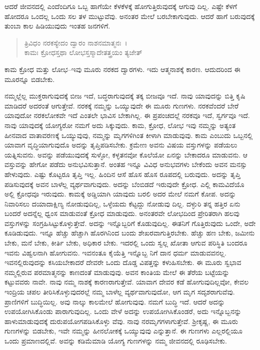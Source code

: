 ಆದರೆ ಜೀವನದಲ್ಲಿ ಎಂದೆಂದಿಗೂ ಒಬ್ಬ ಹಾಗೆಯೇ ಕೆಳಕೆಳಕ್ಕೆ ಹೋಗುತ್ತಿರುವುದಕ್ಕೆ ಆಗುವು ದಿಲ್ಲ. ಎಷ್ಟೇ ಕೆಳಗೆ ಹೋದರೂ ಒಂದಲ್ಲ ಒಂದು ಸಲ ತಳ ಮುಟ್ಟುವೆವು. ಅನಂತರ ಮೇಲೆ ಬರಬೇಕಾಗುವುದು. ಆದರೆ ಹಾಗೆ ಬರುವುದಕ್ಕೆ ತುಂಬಾ ಕಾಲ ಹಿಡಿಯುವುದು ಇಂತಹ ಜನಗಳಿಗೆ.

\begin{verse}
ತ್ರಿವಿಧಂ ನರಕಸ್ಯೇದಂ ದ್ವಾರಂ ನಾಶನಮಾತ್ಮನಃ~।\\ಕಾಮಃ ಕ್ರೋಧಸ್ತಥಾ ಲೋಭಸ್ತಸ್ಮಾದೇತತ್ತ್ರಯಂ ತ್ಯಜೇತ್ 
\end{verse}

{\small ಕಾಮ ಕ್ರೋಧ ಮತ್ತು ಲೋಭ--ಇವು ಮೂರು ನರಕದ ದ್ವಾರಗಳು. ಇದು ಆತ್ಮನಾಶಕ್ಕೆ ಕಾರಣ. ಆದುದರಿಂದ ಈ ಮೂರನ್ನೂ ಬಿಡಬೇಕು.}

ನಮ್ಮಲ್ಲೆಲ್ಲ ಮುಕ್ತರಾಗುವುದಕ್ಕೆ ಬೀಜ ಇದೆ, ಬದ್ಧರಾಗುವುದಕ್ಕೆ ತಕ್ಕ ಬೀಜವೂ ಇದೆ. ನಾವು ಯಾವುದನ್ನು ಬಿತ್ತಿ ಕೃಷಿ ಮಾಡಿದರೆ ಅದರಂತೆ ಆಗುತ್ತೇವೆ. ನರಕಕ್ಕೆ ನಮ್ಮನ್ನು ಒಯ್ಯುವುದೇ ಈ ಮೂರು ಗುಣಗಳು. ನರಕವೆಂದರೆ ಬೇರೆ ಯಾವುದೋ ನರಕಲೋಕವೇ ಇದೆ ಎಂತಲೇ ಭಾವಿಸ ಬೇಕಾಗಿಲ್ಲ. ಈ ಪ್ರಪಂಚದಲ್ಲೆ ನರಕವೂ ಇದೆ, ಸ್ವರ್ಗವೂ ಇದೆ. ನಾವು ಯಾವುದಕ್ಕೆ ಯೋಗ್ಯರೋ ನಮಗೆ ಅದು ಸಿಕ್ಕುವುದು. ಕಾಮ, ಕ್ರೋಧ, ಲೋಭ ಇವು ನಮ್ಮನ್ನು ಅತ್ಯಂತ ಹೀನವಾದ ವಾತಾವರಣಕ್ಕೆ ಒಯ್ಯುವುವು, ನಮ್ಮನ್ನು ಮೃಗಗಳಿಗಿಂತ ಕೀಳಾಗಿ ಮಾಡುವುವು. ಕಾಮ ಎಂಬುದು ಒಬ್ಬನಲ್ಲಿ ಯಾವಾಗ ವೃದ್ಧಿಯಾಗುವುದೊ ಅದನ್ನು ತೃಪ್ತಿಪಡಿಸಬೇಕು. ಕ್ರಮೇಣ ಅವನು ವಿಷಯ ವಸ್ತುಗಳನ್ನು ಪಡೆಯಲು ಯತ್ನಿಸುವನು. ಅವನ್ನು ಪಡೆಯುವುದಕ್ಕೆ ಸುಳ್ಳೋ, ಕಳ್ಳತನವೋ ಕೊಲೆಯೋ ಏನನ್ನು ಬೇಕಾದರೂ ಮಾಡುವನು. ಆ ವಸ್ತುವನ್ನು ಹೇಗೋ ಪಡೆದು ಅನುಭವಿಸುತ್ತಾನೆ. ಅಂತಹ ಇನ್ನೂ ವಿವಿಧ ಅನುಭವಗಳು ಬೇಕೆಂದು ಅವನ ಮನಸ್ಸು ಹೇಳುವುದು. ಎಷ್ಟು ಕೊಟ್ಟರೂ ತೃಪ್ತಿ ಇಲ್ಲ. ಹಿಂದಿನ ಆಸೆ ಹೊಸ ಹೊಸ ರೂಪದಲ್ಲಿ ಬರುವುದು. ಅದನ್ನು ತೃಪ್ತಿ ಪಡಿಸುವುದಕ್ಕೆ ಅವನ ಬಾಳೆಲ್ಲ ವ್ಯರ್ಥವಾಗುವುದು. ಅದನ್ನು ಬೆಂಬಿಡದೆ ಇರುವುದೇ ಕ್ರೋಧ. ಎಲ್ಲಿ ಕಾಮವಿದೆಯೊ ಅಲ್ಲಿ ಕ್ರೋಧವೂ ಇರುವುದು. ಕಾಮಕ್ಕೆ ಅಡ್ಡಿಯಾಗಿ ಯಾವುದು ಬರಲಿ ಅದರ ಮೇಲೆ ನಮಗೆ ಕೋಪ. ಅದನ್ನು ನಿವಾರಿಸಲು ದಯಾದಾಕ್ಷಿಣ್ಯ ನೋಡುವುದಿಲ್ಲ, ಒಳ್ಳೆಯದು ಕೆಟ್ಟದ್ದು ನೋಡುವು ದಿಲ್ಲ. ದಳ್ಳುರಿ ತನ್ನ ಹತ್ತಿರ ಏನು ಬಂದರೆ ಅದನ್ನೆಲ್ಲ ಧ್ವಂಸ ಮಾಡುವಂತೆ ಕ್ರೋಧ ಮಾಡುವುದು. ಅನಂತರವೇ ಲೋಭದಿಂದ ಪ್ರೇರಿತರಾಗಿ ಹಲವು ವಸ್ತುಗಳನ್ನು ಸಂಗ್ರಹಿಸಿಟ್ಟುಕೊಳ್ಳುತ್ತೇವೆ. ಅದನ್ನು ಇನ್ನೊಬ್ಬರಿಗೆ ಕೊಡುವುದಿಲ್ಲ. ಈತನಿಗೆ ಗೊತ್ತಿರುವುದು ಒಂದೇ, ಅದೇ ಕೂಡಿಡುವುದು. ಇನ್ನೂ ಹೆಚ್ಚು ಹೆಚ್ಚಾಗಿ ಹೊರಗಿನಿಂದ ಬಂದು ಶೇಖರವಾಗುತ್ತಿರಬೇಕು. ಹೆಚ್ಚು ಹಣ ಬೇಕು, ಜಮೀನು ಬೇಕು, ಮನೆ ಬೇಕು, ಕೀರ್ತಿ ಬೇಕು, ಅಧಿಕಾರ ಬೇಕು. ಇದರಲ್ಲಿ ಒಂದು ಸ್ವಲ್ಲ ಖೋತಾ ಆಗುವ ಪರಿಸ್ಥಿತಿ ಬಂದರೂ ಇವನು ವಿಹ್ವಲನಾಗಿ ಹೋಗುವನು. ಇವನಂತೂ ಕೈಯೆತ್ತಿ ಇನ್ನೊಬ್ಬ ನಿಗೆ ದಾನ ಧರ್ಮ ಮಾಡುವವನಲ್ಲ. ಇವನಲ್ಲಿರುವುದನ್ನು ಕಸಿಯಬೇಕಾದರೆ ದೇವರೇ ಒಂದು ದೊಡ್ಡ ವಿಪತ್ತನ್ನು ಕಳುಹಿಸಬೇಕು. ಈ ಮೂರು ಸ್ವಭಾವ ನಮ್ಮಲ್ಲಿರುವ ಪರಮಾತ್ಮನನ್ನು ಕಾಣದಂತೆ ಮಾಡುವುವು. ಅವನ ಕಾಂತಿಯ ಮೇಲೆ ಈ ತೆರೆಯ ಬಟ್ಟೆಯನ್ನು ಕಟ್ಟುವವರು ನಾವೇ. ನಾವು ನಮ್ಮ ನಾಶಕ್ಕೆ ಕಾರಣರಾಗುತ್ತೇವೆ. ಯಾವಾಗ ದೇವರ ಕಡೆ ಹೋಗುವುದಿಲ್ಲವೋ, ಕೇವಲ ಇಂದ್ರಿಯ ಚಪಲ ತೀರಿಸಿಕೊಳ್ಳುವುದರಲ್ಲೆ ನಮ್ಮ ಬಾಳೆಲ್ಲ ವ್ಯರ್ಥವಾಗುವುದೋ, ಆಗ ಮೃಗ ಸದೃಶರಾಗುವೆವು. ಪ್ರಾಣಿಗಳಿಗೆ ಬುದ್ಧಿಯಿಲ್ಲ. ಅವು ನಾಲ್ಕು ಕಾಲಮೇಲೆ ಹೋಗುವುವು. ನಮಗೆ ಬುದ್ಧಿ ಇದೆ. ಆದರೆ ಅದನ್ನು ಉಪಯೋಗಿಸಿಕೊಂಡು ಪಾರಾಗುವುದಿಲ್ಲ. ಒಂದು ವೇಳೆ ಅದನ್ನು ಉಪಯೋಗಿಸಿಕೊಂಡರೆ, ಅದು ಇನ್ನೊಬ್ಬನನ್ನು ಹಾಳುಮಾಡುವುದಕ್ಕೆ ದುರುಪಯೋಗಪಡಿಸಿಕೊಳ್ಳು ವೆವು. ನಾವು ನರಮೃಗಗಳಾಗುತ್ತೇವೆ. ಶ‍್ರೀಕೃಷ್ಣ, ಈ ಮೂರು ಗುಣಗಳನ್ನು ಬಿಡಬೇಕು, ಇವೇ ನಮ್ಮನ್ನು ಹೀನಲೋಕಕ್ಕೆ ಒಯ್ಯುವುವು ಎನ್ನುತ್ತಾನೆ. ಈ ಗುಣಗಳು ಎಲ್ಲರಲ್ಲಿಯೂ ಒಂದು ಪ್ರಮಾಣದಲ್ಲಿವೆ. ಅವನ್ನು ಕಡಿಮೆಮಾಡಿ ಯೋಗ್ಯ ಗುಣಗಳನ್ನು ನಮ್ಮ ಜೀವನದಲ್ಲಿ ರೂಢಿಸಬೇಕು.


